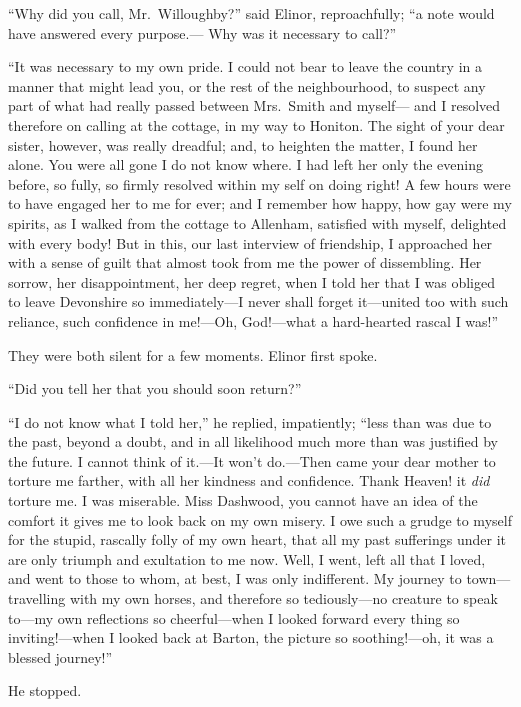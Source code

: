 \documentclass{article}
\begin{document}
``Why did you call, Mr.\ Willoughby?'' said Elinor,
reproachfully; ``a note would have answered every purpose.---%
Why was it necessary to call?''

``It was necessary to my own pride.  I could not bear
to leave the country in a manner that might lead you,
or the rest of the neighbourhood, to suspect any part
of what had really passed between Mrs.\ Smith and myself---%
and I resolved therefore on calling at the cottage,
in my way to Honiton.  The sight of your dear sister,
however, was really dreadful; and, to heighten the matter,
I found her alone.  You were all gone I do not know where.
I had left her only the evening before, so fully,
so firmly resolved within my self on doing right!
A few hours were to have engaged her to me for ever;
and I remember how happy, how gay were my spirits, as I
walked from the cottage to Allenham, satisfied with myself,
delighted with every body!  But in this, our last interview
of friendship, I approached her with a sense of guilt
that almost took from me the power of dissembling.
Her sorrow, her disappointment, her deep regret, when I told
her that I was obliged to leave Devonshire so immediately---I
never shall forget it---united too with such reliance,
such confidence in me!---Oh, God!---what a hard-hearted
rascal I was!''

They were both silent for a few moments.
Elinor first spoke.

``Did you tell her that you should soon return?''

``I do not know what I told her,'' he replied, impatiently;
``less than was due to the past, beyond a doubt, and in all
likelihood much more than was justified by the future.
I cannot think of it.---It won't do.---Then came your dear mother
to torture me farther, with all her kindness and confidence.
Thank Heaven! it \emph{did} torture me.  I was miserable.
Miss Dashwood, you cannot have an idea of the comfort it
gives me to look back on my own misery.  I owe such a grudge
to myself for the stupid, rascally folly of my own heart,
that all my past sufferings under it are only triumph and
exultation to me now.  Well, I went, left all that I loved,
and went to those to whom, at best, I was only indifferent.
My journey to town---travelling with my own horses,
and therefore so tediously---no creature to speak to---my
own reflections so cheerful---when I looked forward
every thing so inviting!---when I looked back at Barton,
the picture so soothing!---oh, it was a blessed journey!''

He stopped.
\end{document}
